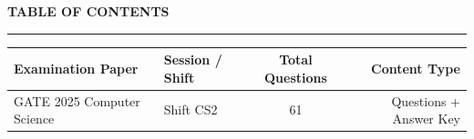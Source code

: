 \documentclass[a4paper,10pt,twoside]{article}
\begin{document}
\newpage

\begin{center}
    {\Large\textbf{TABLE OF CONTENTS}}\\[0.4em]
    \rule{0.5\textwidth}{0.6pt}
\end{center}
\vspace{1em}

\noindent\begin{tabularx}{\linewidth}{|X|l|c|r|}
\hline
\textbf{Examination Paper} & \textbf{Session / Shift} & \textbf{Total Questions} & \textbf{Content Type} \\
\hline

GATE 2025 Computer Science & Shift CS2 & 61 & Questions + Answer Key \\ \hline
\end{tabularx}

\vspace{1.5em}

\newpage
\end{document}
